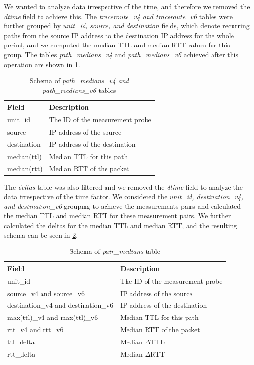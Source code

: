 \FloatBarrier

We wanted to analyze data irrespective of the time, and therefore we removed the \textit{dtime} field to achieve this. The \textit{traceroute\_v4 and traceroute\_v6} tables were further grouped by \textit{unit\_id, source, and destination} fields, which denote recurring paths from the source IP address to the destination IP address for the whole period, and we computed the median TTL and median RTT values for this group. The tables \textit{path\_medians\_v4} and \textit{path\_medians\_v6} achieved after this operation are shown in \cref{table:pathv4v6mlab}.

\begin{table}[!h]
	\centering
	\caption{Schema of \textit{path\_medians\_v4 and path\_medians\_v6} tables}
	\label{table:pathv4v6mlab}
	\begin{tabular}{lp{7cm}}
  		\toprule
  		\textbf{Field} & \textbf{Description} \\ 
  		\midrule
  		unit\_id & The ID of the measurement probe \\ 
		source &  IP address of the source \\ 
		destination & IP address of the destination \\   
		median(ttl) & Median TTL for this path \\ 
		median(rtt) & Median RTT of the packet \\
  		\bottomrule
\end{tabular}
\end{table}

\FloatBarrier

The \textit{deltas} table was also filtered and we removed the \textit{dtime} field to analyze the data irrespective of the time factor. We considered the \textit{unit\_id, destination\_v4, and destination\_v6} grouping to achieve the measurements pairs and calculated the median TTL and median RTT for these measurement pairs. We further calculated the deltas for the median TTL and median RTT, and the resulting schema can be seen in \cref{table:pairmlab}.  

\begin{table}[!h]
	\centering
	\caption{Schema of \textit{pair\_medians} table}
	\label{table:pairmlab}
	\begin{tabular}{lp{7cm}}
  		\toprule
  		\textbf{Field} & \textbf{Description} \\ 
  		\midrule
  		unit\_id & The ID of the measurement probe \\ 
		source\_v4 and source\_v6 &  IP address of the source \\ 
		destination\_v4 and destination\_v6 & IP address of the destination \\   
		max(ttl)\_v4 and max(ttl)\_v6 & Median TTL for this path \\ 
		rtt\_v4 and rtt\_v6 & Median RTT of the packet \\
		ttl\_delta & Median $\Delta$TTL \\
		rtt\_delta & Median $\Delta$RTT \\
  		\bottomrule
\end{tabular}
\end{table}

